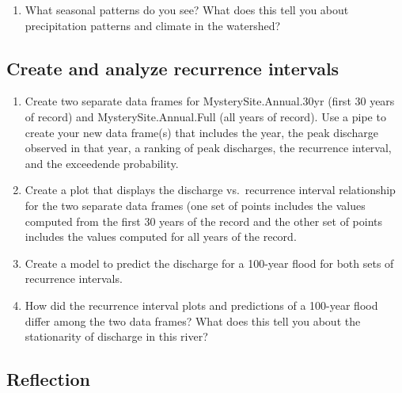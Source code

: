\documentclass[]{article}
\providecommand{\tightlist}{%
  \setlength{\itemsep}{0pt}\setlength{\parskip}{0pt}}
\begin{document}
\begin{enumerate}
\def\labelenumi{\arabic{enumi}.}
\setcounter{enumi}{7}
\tightlist
\item
  What seasonal patterns do you see? What does this tell you about
  precipitation patterns and climate in the watershed?
\end{enumerate}

\begin{quote}
\end{quote}

\hypertarget{create-and-analyze-recurrence-intervals}{%
\subsection{Create and analyze recurrence
intervals}\label{create-and-analyze-recurrence-intervals}}

\begin{enumerate}
\def\labelenumi{\arabic{enumi}.}
\setcounter{enumi}{8}
\item
  Create two separate data frames for MysterySite.Annual.30yr (first 30
  years of record) and MysterySite.Annual.Full (all years of record).
  Use a pipe to create your new data frame(s) that includes the year,
  the peak discharge observed in that year, a ranking of peak
  discharges, the recurrence interval, and the exceedende probability.
\item
  Create a plot that displays the discharge vs.~recurrence interval
  relationship for the two separate data frames (one set of points
  includes the values computed from the first 30 years of the record and
  the other set of points includes the values computed for all years of
  the record.
\item
  Create a model to predict the discharge for a 100-year flood for both
  sets of recurrence intervals.
\item
  How did the recurrence interval plots and predictions of a 100-year
  flood differ among the two data frames? What does this tell you about
  the stationarity of discharge in this river?
\end{enumerate}

\begin{quote}
\end{quote}

\hypertarget{reflection}{%
\subsection{Reflection}\label{reflection}}
\end{document}
